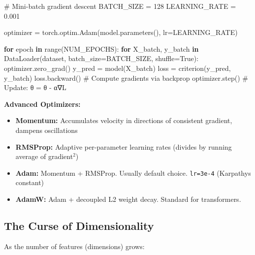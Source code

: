 \documentclass[11pt]{article}
\providecommand{\tightlist}{\setlength{\itemsep}{1pt}\setlength{\parskip}{0pt}}
\newenvironment{Shaded}{\begin{snugshade}}{\end{snugshade}}
\newcommand{\BuiltInTok}[1]{\textcolor[rgb]{0.50,0.55,0.55}{#1}}
\newcommand{\CommentTok}[1]{\textcolor[rgb]{0.48,0.49,0.49}{#1}}
\newcommand{\ControlFlowTok}[1]{\textcolor[rgb]{0.99,0.74,0.29}{\textbf{#1}}}
\newcommand{\DecValTok}[1]{\textcolor[rgb]{0.96,0.45,0.00}{#1}}
\newcommand{\FloatTok}[1]{\textcolor[rgb]{0.96,0.45,0.00}{#1}}
\newcommand{\KeywordTok}[1]{\textcolor[rgb]{0.81,0.81,0.76}{\textbf{#1}}}
\newcommand{\NormalTok}[1]{\textcolor[rgb]{0.81,0.81,0.76}{#1}}
\newcommand{\OperatorTok}[1]{\textcolor[rgb]{0.81,0.81,0.76}{#1}}
\newcommand{\VariableTok}[1]{\textcolor[rgb]{0.15,0.68,0.68}{#1}}
\begin{document}
\begin{Shaded}
\begin{Highlighting}[]
\CommentTok{\# Mini{-}batch gradient descent}
\NormalTok{BATCH\_SIZE }\OperatorTok{=} \DecValTok{128}
\NormalTok{LEARNING\_RATE }\OperatorTok{=} \FloatTok{0.001}

\NormalTok{optimizer }\OperatorTok{=}\NormalTok{ torch.optim.Adam(model.parameters(), lr}\OperatorTok{=}\NormalTok{LEARNING\_RATE)}

\ControlFlowTok{for}\NormalTok{ epoch }\KeywordTok{in} \BuiltInTok{range}\NormalTok{(NUM\_EPOCHS):}
    \ControlFlowTok{for}\NormalTok{ X\_batch, y\_batch }\KeywordTok{in}\NormalTok{ DataLoader(dataset, batch\_size}\OperatorTok{=}\NormalTok{BATCH\_SIZE, shuffle}\OperatorTok{=}\VariableTok{True}\NormalTok{):}
\NormalTok{        optimizer.zero\_grad()}
\NormalTok{        y\_pred }\OperatorTok{=}\NormalTok{ model(X\_batch)}
\NormalTok{        loss }\OperatorTok{=}\NormalTok{ criterion(y\_pred, y\_batch)}
\NormalTok{        loss.backward()     }\CommentTok{\# Compute gradients via backprop}
\NormalTok{        optimizer.step()    }\CommentTok{\# Update: θ = θ {-} α∇L}
\end{Highlighting}
\end{Shaded}

\textbf{Advanced Optimizers:}

\begin{itemize}
\tightlist
\item
  \textbf{Momentum:} Accumulates velocity in directions of consistent gradient, dampens oscillations
\item
  \textbf{RMSProp:} Adaptive per-parameter learning rates (divides by running average of gradient\(^2\))
\item
  \textbf{Adam:} Momentum + RMSProp. Usually default choice. \texttt{lr=3e-4} (Karpathy\textquotesingle s constant)
\item
  \textbf{AdamW:} Adam + decoupled L2 weight decay. Standard for transformers.
\end{itemize}

\subsection{The Curse of Dimensionality}\label{the-curse-of-dimensionality}

As the number of features (dimensions) grows:
\end{document}
